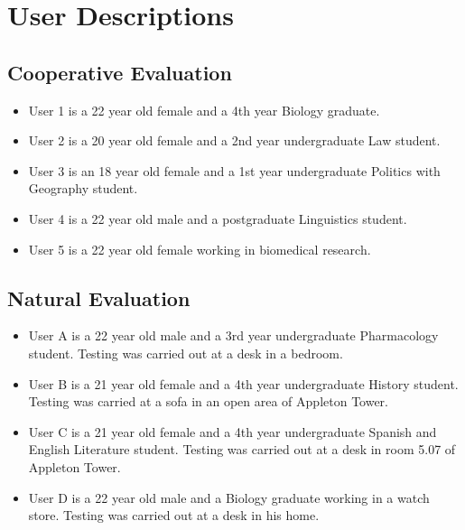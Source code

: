 \documentclass[11pt,twocolumn]{article}
\begin{document}
\onecolumn

\appendix
\appendixpage

\section{User Descriptions}

\subsection{Cooperative Evaluation}

\begin{itemize}
\item User 1 is a 22 year old female and a 4th year Biology graduate.
\item User 2 is a 20 year old female and a 2nd year undergraduate Law student. 
\item User 3 is an 18 year old female and a 1st year undergraduate Politics
with Geography student. 
\item User 4 is a 22 year old male and a postgraduate Linguistics student. 
\item User 5 is a 22 year old female working in biomedical research. 
\end{itemize}

\subsection{Natural Evaluation}

\begin{itemize}
\item User A is a 22 year old male and a 3rd year undergraduate Pharmacology
student. Testing was carried out at a desk in a bedroom.
\item User B is a 21 year old female and a 4th year undergraduate History
student. Testing was carried at a sofa in an open area of Appleton Tower.
\item User C is a 21 year old female and a 4th year undergraduate Spanish and
English Literature student. Testing was carried out at a desk in room 5.07 of
Appleton Tower.
\item User D is a 22 year old male and a Biology graduate working in a watch
store. Testing was carried out at a desk in his home. 
\end{itemize}
\end{document}
